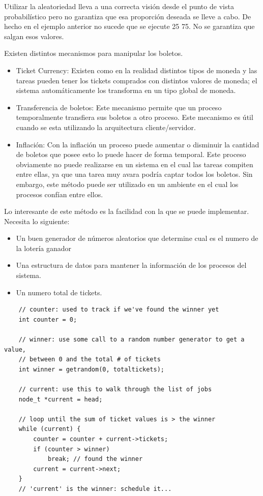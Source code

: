 \documentclass[titlepage,a4paper]{article}
\begin{document}
Utilizar la aleatoriedad lleva a una correcta visión desde el punto de vista probabilístico pero no garantiza que esa proporción deseada se lleve a cabo. De hecho en el ejemplo anterior no sucede que se ejecute 25 75. No se garantiza que salgan esos valores.

Existen distintos mecanismos para manipular los boletos.
\begin{itemize}
    \item Ticket Currency: Existen como en la realidad distintos tipos de moneda y las tareas pueden tener los tickets comprados con distintos valores de moneda; el sistema automáticamente los transforma en un tipo global de moneda.
    \item Transferencia de boletos: Este mecanismo permite que un proceso temporalmente transfiera sus boletos a otro proceso. Este mecanismo es útil cuando se esta utilizando la arquitectura cliente/servidor.
    \item Inflación: Con la inflación un proceso puede aumentar o disminuir la cantidad de boletos que posee esto lo puede hacer de forma temporal. Este proceso obviamente no puede realizarse en un sistema en el cual las tareas compiten entre ellas, ya que una tarea muy avara podría captar todos los boletos. Sin embargo, este método puede ser utilizado en un ambiente en el cual los procesos confían entre ellos.
\end{itemize}

Lo interesante de este método es la facilidad con la que se puede implementar. Necesita lo siguiente:
\begin{itemize}
    \item Un buen generador de números aleatorios que determine cual es el numero de la lotería ganador
    \item Una estructura de datos para mantener la información de los procesos del sistema.
    \item Un numero total de tickets.
\end{itemize}

\begin{verbatim}
    // counter: used to track if we've found the winner yet
    int counter = 0;
    
    // winner: use some call to a random number generator to get a value,
    // between 0 and the total # of tickets
    int winner = getrandom(0, totaltickets);
    
    // current: use this to walk through the list of jobs
    node_t *current = head;
    
    // loop until the sum of ticket values is > the winner
    while (current) {
        counter = counter + current->tickets;
        if (counter > winner)
            break; // found the winner
        current = current->next;
    }
    // 'current' is the winner: schedule it...
\end{verbatim}
\end{document}
